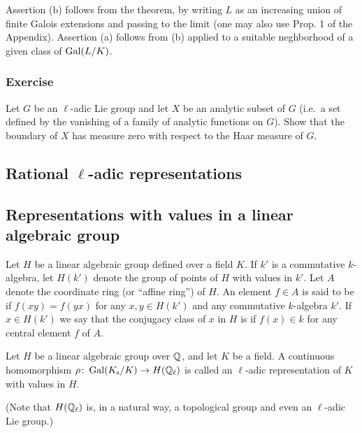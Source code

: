 Assertion (b) follows from the theorem, by writing $L$ as an increasing union
of finite Galois extensions and passing to the limit (one may also use Prop. 1
of the Appendix). Assertion (a) follows from (b) applied to a suitable
neghborhood of a given class of $\operatorname{Gal}(L/K)$.

\subsubsection*{Exercise}
Let $G$ be an $\ell$-adic Lie group and let $X$ be an analytic subset of $G$
(i.e.\ a set defined by the vanishing of a family of analytic functions on $G$).
Show that the boundary of $X$ has measure zero
\dpage
with respect to the Haar measure of $G$.

\subsection{Rational \texorpdfstring{$\ell$}{l}-adic representations}

\subsection{Representations with values in a linear algebraic group}
Let $H$ be a linear algebraic group defined over a field $K$. If
$k'$ is a commutative $k$-algebra, let $H(k')$ denote the group of points
of $H$ with values in $k'$. Let $A$ denote the coordinate ring (or
``affine ring'') of $H$. An element $f \in A$ is said to be  if
$f(xy) = f(yx)$ for any $x, y \in H(k')$ and any commutative $k$-algebra
$k'$. If $x \in H(k')$ we say that the conjugacy class of $x$ in $H$ is
 if $f(x) \in k$ for any central element $f$ of $A$.

\begin{mydef}
Let $H$ be a linear algebraic group over $\mathbb{Q}$, and let
$K$ be a field. A continuous homomorphism $\rho \colon \operatorname{Gal}(K_{\mathrm{s}}/K) \to H(\mathbb{Q}_\ell)$
is called an $\ell$-adic representation of $K$ with values in $H$.
\end{mydef}
(Note that $H(\mathbb{Q}_\ell)$ is, in a natural way, a topological group and even
an $\ell$-adic Lie group.)

